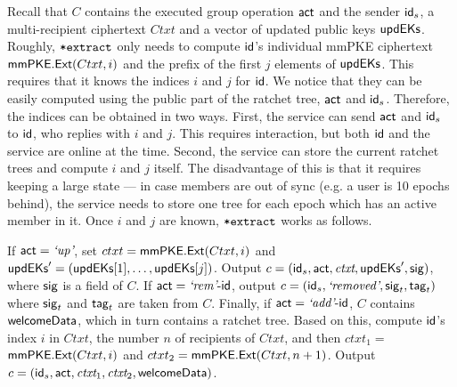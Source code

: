 Recall that $C$ contains the executed group operation $\mathsf{act}$ and the sender ${\mathsf{id}}_s$, a multi-recipient ciphertext $Ctxt$ and a vector of updated public keys ${\mathsf{updEKs}}$. Roughly, ${\textnormal{\tt*extract}}$ only needs to compute ${\mathsf{id}}$'s individual mmPKE ciphertext ${\mathsf{mmPKE}}.{\mathsf{Ext}}(Ctxt, i)$ and the prefix of the first $j$ elements of ${\mathsf{updEKs}}$. This requires that it knows the indices $i$ and $j$ for ${\mathsf{id}}$.
%
We notice that they can be easily computed using the public part of the ratchet tree, $\mathsf{act}$ and ${\mathsf{id}}_s$. Therefore, the indices can be obtained in two ways. First, the service can send $\mathsf{act}$ and ${\mathsf{id}}_s$ to ${\mathsf{id}}$, who replies with $i$ and $j$.  This requires interaction, but both ${\mathsf{id}}$ and the service are online at the time. Second, the service can store the current ratchet trees and compute $i$ and $j$ itself. The disadvantage of this is that it requires keeping a large state --- in case members are out of sync (e.g. a user is 10 epochs behind), the service needs to store one tree for each epoch which has an active member in it.
%
Once $i$ and $j$ are known, ${\textnormal{\tt*extract}}$ works as follows.

If $\mathsf{act} = {\text{\normalfont \it`up'}}$, set  $ctxt = {\mathsf{mmPKE}}.{\mathsf{Ext}}(Ctxt, i)$ and ${\mathsf{updEKs}}' = ({\mathsf{updEKs}}[1], \dots, {\mathsf{updEKs}}[j])$. Output $c =  ({\mathsf{id}}_s, \mathsf{act}, {\normalfont\textit{ctxt}},\allowbreak  {\ensuremath{\mathsf{updEKs}}}',\allowbreak  {\ensuremath{\mathsf{sig}}})$, where ${\mathsf{sig}}$ is a field of $C$. If $\mathsf{act} = {\text{\normalfont \it`rem'}}\textrm{-}{\ensuremath{\mathsf{id}}}$, output $c =  ({\mathsf{id}}_s, {\text{\normalfont \it`removed'}}, {\mathsf{sig}}_t, {\mathsf{tag}}_t)$ where $ {\mathsf{sig}}_t$ and ${\mathsf{tag}}_t$ are taken from $C$. Finally, if $\mathsf{act} = {\text{\normalfont \it`add'}}\textrm{-}{\ensuremath{\mathsf{id}}}$, $C$ contains $\textnormal{\textsf{welcomeData}}$, which in turn contains a ratchet tree. Based on this, compute ${\mathsf{id}}$'s index $i$ in $Ctxt$,  the number $n$ of recipients of $Ctxt$, and then $ctxt_1 = $ ${\mathsf{mmPKE}}.{\mathsf{Ext}}(Ctxt, i)$ and $ctxt_2 = {\mathsf{mmPKE}}.{\mathsf{Ext}}(Ctxt, n+1)$. Output $c =  ({\mathsf{id}}_s, \mathsf{act}, {\normalfont\textit{ctxt}}_1,\allowbreak  {\normalfont\textit{ctxt}}_2,\allowbreak  \textnormal{\textsf{welcomeData}})$.

